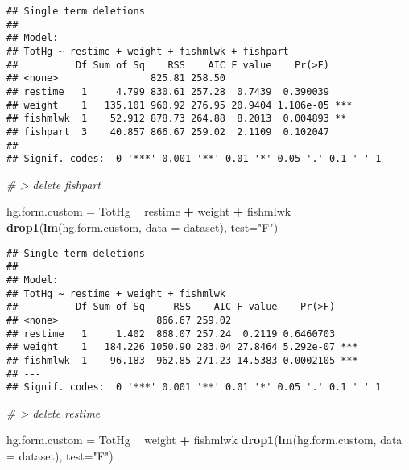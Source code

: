 \documentclass[12pt,]{article}
\newenvironment{Shaded}{\begin{snugshade}}{\end{snugshade}}
\newcommand{\KeywordTok}[1]{\textcolor[rgb]{0.13,0.29,0.53}{\textbf{#1}}}
\newcommand{\DataTypeTok}[1]{\textcolor[rgb]{0.13,0.29,0.53}{#1}}
\newcommand{\StringTok}[1]{\textcolor[rgb]{0.31,0.60,0.02}{#1}}
\newcommand{\CommentTok}[1]{\textcolor[rgb]{0.56,0.35,0.01}{\textit{#1}}}
\newcommand{\OperatorTok}[1]{\textcolor[rgb]{0.81,0.36,0.00}{\textbf{#1}}}
\newcommand{\NormalTok}[1]{#1}
\begin{document}
\begin{verbatim}
## Single term deletions
## 
## Model:
## TotHg ~ restime + weight + fishmlwk + fishpart
##          Df Sum of Sq    RSS    AIC F value    Pr(>F)    
## <none>                825.81 258.50                      
## restime   1     4.799 830.61 257.28  0.7439  0.390039    
## weight    1   135.101 960.92 276.95 20.9404 1.106e-05 ***
## fishmlwk  1    52.912 878.73 264.88  8.2013  0.004893 ** 
## fishpart  3    40.857 866.67 259.02  2.1109  0.102047    
## ---
## Signif. codes:  0 '***' 0.001 '**' 0.01 '*' 0.05 '.' 0.1 ' ' 1
\end{verbatim}

\begin{Shaded}
\begin{Highlighting}[]
\CommentTok{# > delete fishpart}

\NormalTok{hg.form.custom =}\StringTok{ }\NormalTok{TotHg }\OperatorTok{~}\StringTok{ }\NormalTok{restime }\OperatorTok{+}\StringTok{ }\NormalTok{weight }\OperatorTok{+}\StringTok{ }\NormalTok{fishmlwk}
\KeywordTok{drop1}\NormalTok{(}\KeywordTok{lm}\NormalTok{(hg.form.custom, }\DataTypeTok{data =}\NormalTok{ dataset), }\DataTypeTok{test=}\StringTok{"F"}\NormalTok{)}
\end{Highlighting}
\end{Shaded}

\begin{verbatim}
## Single term deletions
## 
## Model:
## TotHg ~ restime + weight + fishmlwk
##          Df Sum of Sq     RSS    AIC F value    Pr(>F)    
## <none>                 866.67 259.02                      
## restime   1     1.402  868.07 257.24  0.2119 0.6460703    
## weight    1   184.226 1050.90 283.04 27.8464 5.292e-07 ***
## fishmlwk  1    96.183  962.85 271.23 14.5383 0.0002105 ***
## ---
## Signif. codes:  0 '***' 0.001 '**' 0.01 '*' 0.05 '.' 0.1 ' ' 1
\end{verbatim}

\begin{Shaded}
\begin{Highlighting}[]
\CommentTok{# > delete restime}

\NormalTok{hg.form.custom =}\StringTok{ }\NormalTok{TotHg }\OperatorTok{~}\StringTok{ }\NormalTok{weight }\OperatorTok{+}\StringTok{ }\NormalTok{fishmlwk}
\KeywordTok{drop1}\NormalTok{(}\KeywordTok{lm}\NormalTok{(hg.form.custom, }\DataTypeTok{data =}\NormalTok{ dataset), }\DataTypeTok{test=}\StringTok{"F"}\NormalTok{)}
\end{Highlighting}
\end{Shaded}
\end{document}
